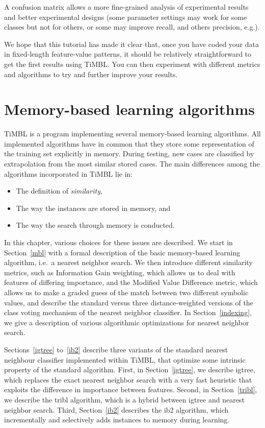 \documentclass{report}
\begin{document}
A confusion matrix allows a more fine-grained analysis of experimental
results and better experimental designs (some parameter settings may
work for some classes but not for others, or some may improve recall,
and others precision, e.g.).

We hope that this tutorial has made it clear that, once you have coded
your data in fixed-length feature-value patterns, it should be
relatively straightforward to get the first results using TiMBL. You
can then experiment with different metrics and algorithms to try and
further improve your results.

\chapter{Memory-based learning algorithms}
\label{algorithms}

TiMBL is a program implementing several memory-based learning
algorithms. All implemented algorithms have in common that they store some
representation of the training set explicitly in memory. During
testing, new cases are classified by extrapolation from the most
similar stored cases. The main differences among the algorithms
incorporated in TiMBL lie in:

\begin{itemize}
\item The definition of {\em similarity},
\item The way the instances are stored in memory, and
\item The way the search through memory is conducted.
\end{itemize}

In this chapter, various choices for these issues are described. We
start in Section~\ref{mbl} with a formal description of the basic
memory-based learning algorithm, i.e.~a nearest neighbor search. We
then introduce different similarity metrics, such as Information Gain
weighting, which allows us to deal with features of differing
importance, and the Modified Value Difference metric, which allows us
to make a graded guess of the match between two different symbolic
values, and describe the standard versus three distance-weighted
versions of the class voting mechanism of the nearest neighbor
classifier. In Section~\ref{indexing}, we give a description of
various algorithmic optimizations for nearest neighbor search.

Sections~\ref{igtree} to~\ref{ib2} describe three variants of the
standard nearest neighbour classifier implemented within TiMBL, that
optimize some intrinsic property of the standard algorithm. First, in
Section~\ref{igtree}, we describe {\sc igtree}, which replaces the
exact nearest neighbor search with a very fast heuristic that exploits
the difference in importance between features. Second, in
Section~\ref{tribl}, we describe the {\sc tribl} algorithm, which is a
hybrid between {\sc igtree} and nearest neighbor search. Third,
Section~\ref{ib2} describes the {\sc ib2} algorithm, which
incrementally and selectively adds instances to memory during
learning.
\end{document}
